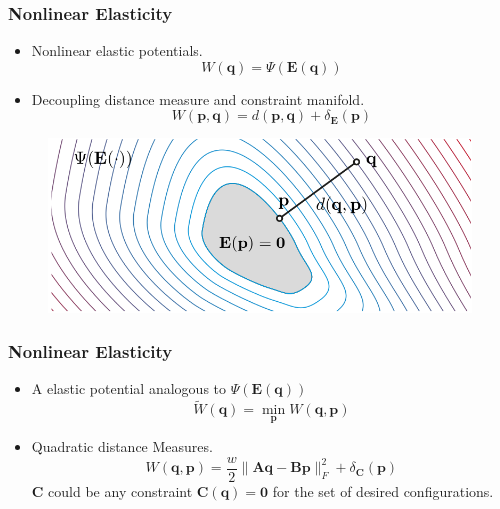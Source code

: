 \documentclass[serif,mathserif]{beamer}
\begin{document}

\begin{frame}
  \frametitle{Nonlinear Elasticity}
  \begin{itemize}
    \item Nonlinear elastic potentials.
      \begin{equation*}
	W(\mathbf{q}) = \Psi(\mathbf{E}(\mathbf{q}))
      \end{equation*}
    \item Decoupling distance measure and constraint manifold.
      \begin{equation*}
       W(\mathbf{p}, \mathbf{q})=d(\mathbf{p}, \mathbf{q})+\delta_{\mathbf{E}}(\mathbf{p})
      \end{equation*}
  \end{itemize}
  \begin{figure}[t]
      \centering
      \includegraphics[scale=0.3]{pic/strain_manifold.png}
  \end{figure}
\end{frame}

\begin{frame}
  \frametitle{Nonlinear Elasticity}
  \begin{itemize}
   \item A elastic potential analogous to $\Psi(\mathbf{E}(\mathbf{q}))$
    \begin{equation*}
      \widetilde{W}(\mathbf{q})=\min_{\mathbf{p}}W(\mathbf{q}, \mathbf{p})
    \end{equation*}
    \item Quadratic distance Measures.
      \begin{equation*}
	W(\mathbf{q}, \mathbf{p})=\frac{w}{2}\|\mathbf{Aq}-\mathbf{Bp}\|^2_F+\delta_{\mathbf{C}}(\mathbf{p})
      \end{equation*}
      $\mathbf{C}$ could be any constraint $\mathbf{C}(\mathbf{q})=\mathbf{0}$ for the set of desired configurations. 
  \end{itemize}
\end{frame}
\end{document}
